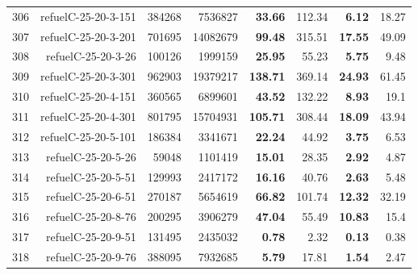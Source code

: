 \begin{longtable}{lrr@{\hskip 12pt}r@{\hskip 12pt}r@{\hskip 12pt}r@{\hskip 12pt}r@{\hskip 12pt}r}
306 & \multirow{1}{*}{refuelC-25-20-3-151} & \multirow{1}{*}{384268} & \multirow{1}{*}{7536827} & \textbf{33.66} & 112.34 & \textbf{6.12} & 18.27 \\
307 & \multirow{1}{*}{refuelC-25-20-3-201} & \multirow{1}{*}{701695} & \multirow{1}{*}{14082679} & \textbf{99.48} & 315.51 & \textbf{17.55} & 49.09 \\
308 & \multirow{1}{*}{refuelC-25-20-3-26} & \multirow{1}{*}{100126} & \multirow{1}{*}{1999159} & \textbf{25.95} & 55.23 & \textbf{5.75} & 9.48 \\
309 & \multirow{1}{*}{refuelC-25-20-3-301} & \multirow{1}{*}{962903} & \multirow{1}{*}{19379217} & \textbf{138.71} & 369.14 & \textbf{24.93} & 61.45 \\
310 & \multirow{1}{*}{refuelC-25-20-4-151} & \multirow{1}{*}{360565} & \multirow{1}{*}{6899601} & \textbf{43.52} & 132.22 & \textbf{8.93} & 19.1 \\
311 & \multirow{1}{*}{refuelC-25-20-4-301} & \multirow{1}{*}{801795} & \multirow{1}{*}{15704931} & \textbf{105.71} & 308.44 & \textbf{18.09} & 43.94 \\
312 & \multirow{1}{*}{refuelC-25-20-5-101} & \multirow{1}{*}{186384} & \multirow{1}{*}{3341671} & \textbf{22.24} & 44.92 & \textbf{3.75} & 6.53 \\
313 & \multirow{1}{*}{refuelC-25-20-5-26} & \multirow{1}{*}{59048} & \multirow{1}{*}{1101419} & \textbf{15.01} & 28.35 & \textbf{2.92} & 4.87 \\
314 & \multirow{1}{*}{refuelC-25-20-5-51} & \multirow{1}{*}{129993} & \multirow{1}{*}{2417172} & \textbf{16.16} & 40.76 & \textbf{2.63} & 5.48 \\
315 & \multirow{1}{*}{refuelC-25-20-6-51} & \multirow{1}{*}{270187} & \multirow{1}{*}{5654619} & \textbf{66.82} & 101.74 & \textbf{12.32} & 32.19 \\
316 & \multirow{1}{*}{refuelC-25-20-8-76} & \multirow{1}{*}{200295} & \multirow{1}{*}{3906279} & \textbf{47.04} & 55.49 & \textbf{10.83} & 15.4 \\
317 & \multirow{1}{*}{refuelC-25-20-9-51} & \multirow{1}{*}{131495} & \multirow{1}{*}{2435032} & \textbf{0.78} & 2.32 & \textbf{0.13} & 0.38 \\
318 & \multirow{1}{*}{refuelC-25-20-9-76} & \multirow{1}{*}{388095} & \multirow{1}{*}{7932685} & \textbf{5.79} & 17.81 & \textbf{1.54} & 2.47 \\
\bottomrule
\end{longtable}